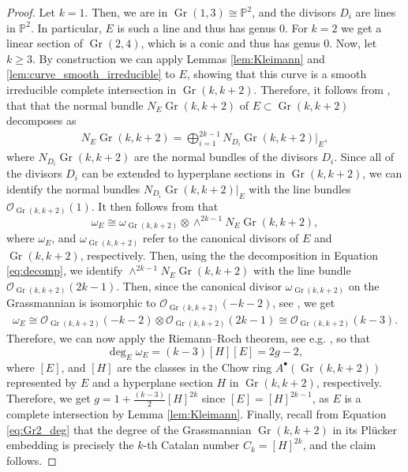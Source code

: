 \documentclass[12pt]{extarticle}
\theoremstyle{definition}
\theoremstyle{theorem}
\theoremstyle{remark}
\numberwithin{equation}{section}
\newcommand{\PP}{\mathbb{P}}
\DeclareMathOperator{\gr}{Gr}
\newcommand{\grk}{\operatorname{Gr}(k,k+2)}
\begin{document}
\begin{proof}
    Let $k=1$. Then, we are in $\gr(1,3)\cong \PP^2$, and the divisors $D_i$ are lines in $\PP^2$. In particular, $E$ is such a line and thus has genus $0$.
    For $k=2$ we get a linear section of $\gr(2,4)$, which is a conic and thus has genus $0$. 
    Now, let $k\geq 3$.
    By construction we can apply Lemmas \ref{lem:Kleimann} and \ref{lem:curve_smooth_irreducible} to $E$, showing that this curve is a smooth irreducible complete intersection in $\grk$.
    Therefore, it follows from \cite[B.7.4]{Fulton1998}, that that the normal bundle $N_E\grk$ of $E\subset\grk$ decomposes as 
    \begin{align}\label{eq:decomp}
    N_E\grk=\bigoplus_{i=1}^{2k-1}N_{D_i}\grk\vert_E,
    \end{align}
    where $N_{D_i}\grk$ are the normal bundles of the divisors $D_i$.
    Since all of the divisors $D_i$ can be extended to hyperplane sections in $\grk$, we can identify the normal bundles $N_{D_i}\grk\vert_E$ with the line bundles $\mathcal O_{\grk}(1)$.
    It then follows from \cite[Proposition 8.20]{Hartshorne1977} that
    \[
    \omega_E\cong \omega_{\grk}\otimes\wedge^{2k-1}N_{E}\grk,
    \]
    where $\omega_E$, and $\omega_{\grk}$ refer to the canonical divisors of $E$ and $\grk$, respectively.
    Then, using the the decomposition in Equation \eqref{eq:decomp}, we identify $\wedge^{2k-1}N_{E}\grk$ with the line bundle $\mathcal{O}_{\grk}(2k-1)$.
    Then, since the canonical divisor $\omega_{\grk}$ on the Grassmannian is isomorphic to $\mathcal{O}_{\grk}(-k-2)$, see \cite[Section 5.7.4]{3264andallthat},
    we get
    \begin{align}\label{eq:can_div_curve}
    \omega_E\cong \mathcal{O}_{\grk}(-k-2)\otimes\mathcal{O}_{\grk}(2k-1)\cong \mathcal{O}_{\grk}(k-3).
    \end{align}
    Therefore, we can now apply the Riemann--Roch theorem, see e.g. \cite[Theorem 3.23]{shafarevich}, so that
    \[
    \deg_E \omega_E=(k-3)[H][E]=2g-2,
    \]
    where $[E]$, and $[H]$ are the classes in the Chow ring $A^\bullet(\grk)$ represented by $E$ and a hyperplane section $H$ in $\grk$, respectively.
    Therefore, we get $g=1+\frac{(k-3)}{2}[H]^{2k}$ since $[E]=[H]^{2k-1}$, as $E$ is a complete intersection by Lemma \ref{lem:Kleimann}.
    Finally, recall from Equation \eqref{eq:Gr2_deg} that the degree of the Grassmannian $\grk$ in its Pl\"ucker embedding is precisely the $k$-th Catalan number $C_k=[H]^{2k}$, and the claim follows.
\end{proof}
\end{document}
